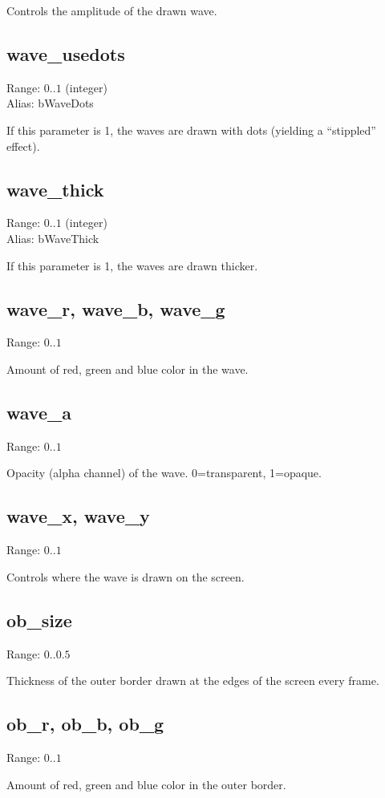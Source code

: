 \documentclass[11pt, a5paper, pagesize]{scrbook}
\begin{document}
Controls the amplitude of the drawn wave.

\subsection{wave\_usedots}
Range: $0..1$ (integer)\\
Alias: bWaveDots

If this parameter is 1, the waves are drawn with dots (yielding a ``stippled'' effect).

\subsection{wave\_thick}
Range: $0..1$ (integer)\\
Alias: bWaveThick

If this parameter is 1, the waves are drawn thicker.

\subsection{wave\_r, wave\_b, wave\_g}
Range: $0..1$

Amount of red, green and blue color in the wave.

\subsection{wave\_a}
Range: $0..1$

Opacity (alpha channel) of the wave. 0=transparent, 1=opaque.

\subsection{wave\_x, wave\_y}
Range: $0..1$

Controls where the wave is drawn on the screen.

\subsection{ob\_size}
Range: $0..0.5$

Thickness of the outer border drawn at the edges of the screen every frame.

\subsection{ob\_r, ob\_b, ob\_g}
Range: $0..1$

Amount of red, green and blue color in the outer border.
\end{document}
